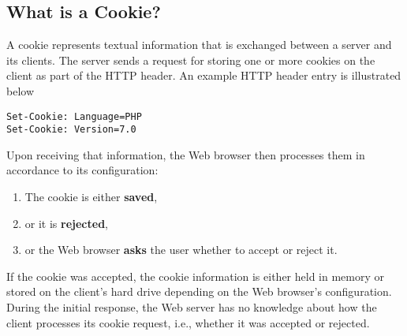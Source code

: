 \documentclass[a4paper, justified, notoc]{tufte-handout} %
\begin{document}
\subsection{What is a Cookie?} %
\label{sub:what_is_a_cookie}
A cookie represents textual information that is exchanged between a server and its clients. 
The server sends a request for storing one or more cookies on the client as part of the HTTP header.
An example HTTP header entry is illustrated below
\begin{Verbatim}
Set-Cookie: Language=PHP
Set-Cookie: Version=7.0
\end{Verbatim}
Upon receiving that information, the Web browser then processes them in accordance to its configuration:
\begin{enumerate}
	\item The cookie is either \textbf{saved},
	\item or it is \textbf{rejected},
	\item or the Web browser \textbf{asks} the user whether to accept or reject it.
\end{enumerate}
If the cookie was accepted, the cookie information is either held in memory or stored on the client's hard drive depending on the Web browser's configuration. %
During the initial response, the Web server has no knowledge about how the client processes its cookie request, i.e., whether it was accepted or rejected.
\end{document}
